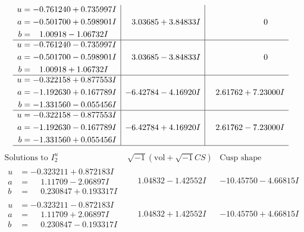 \documentclass[1p]{elsarticle_modified}
\theoremstyle{definition}
\newcommand{\I}{\sqrt{-1}}
\begin{document}
$$\begin{array}{c|c|c}
\begin{aligned}
u &= -0.761240 + 0.735997 I \\
a &= -0.501700 + 0.598901 I \\
b &= \phantom{-}1.00918 - 1.06732 I\end{aligned}
 & \phantom{-}3.03685 + 3.84833 I & \phantom{-0.000000 } 0 \\ \hline\begin{aligned}
u &= -0.761240 - 0.735997 I \\
a &= -0.501700 - 0.598901 I \\
b &= \phantom{-}1.00918 + 1.06732 I\end{aligned}
 & \phantom{-}3.03685 - 3.84833 I & \phantom{-0.000000 } 0 \\ \hline\begin{aligned}
u &= -0.322158 + 0.877553 I \\
a &= -1.192630 + 0.167789 I \\
b &= -1.331560 - 0.055456 I\end{aligned}
 & -6.42784 - 4.16920 I & \phantom{-}2.61762 + 7.23000 I \\ \hline\begin{aligned}
u &= -0.322158 - 0.877553 I \\
a &= -1.192630 - 0.167789 I \\
b &= -1.331560 + 0.055456 I\end{aligned}
 & -6.42784 + 4.16920 I & \phantom{-}2.61762 - 7.23000 I\\
 \hline 
 \end{array}$$\newpage$$\begin{array}{c|c|c}  
\text{Solutions to }I^u_{2}& \I (\text{vol} + \sqrt{-1}CS) & \text{Cusp shape}\\
 \hline 
\begin{aligned}
u &= -0.323211 + 0.872183 I \\
a &= \phantom{-}1.11709 - 2.06897 I \\
b &= \phantom{-}0.230847 + 0.193317 I\end{aligned}
 & \phantom{-}1.04832 - 1.42552 I & -10.45750 - 4.66815 I \\ \hline\begin{aligned}
u &= -0.323211 - 0.872183 I \\
a &= \phantom{-}1.11709 + 2.06897 I \\
b &= \phantom{-}0.230847 - 0.193317 I\end{aligned}
 & \phantom{-}1.04832 + 1.42552 I & -10.45750 + 4.66815 I \\ \hline\begin{aligned}

\end{aligned}
\end{array}$$
\end{document}
